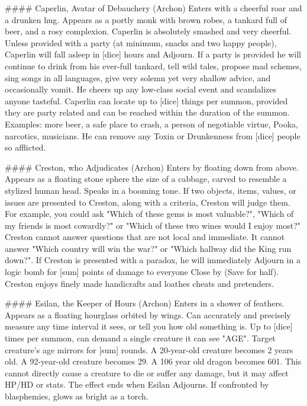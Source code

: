 ####  Caperlin, Avatar of Debauchery (Archon)
Enters with a cheerful roar and a drunken hug. Appears as a portly monk with brown robes, a tankard full of beer, and a rosy complexion. Caperlin is absolutely smashed and very cheerful. Unless provided with a party (at minimum, snacks and two happy people), Caperlin will fall asleep in [dice] hours and Adjourn. If a party is provided he will continue to drink from his ever-full tankard, tell wild tales, propose mad schemes, sing songs in all languages, give very solemn yet very shallow advice, and occasionally vomit. He cheers up any low-class social event and scandalizes anyone tasteful. Caperlin can locate up to [dice] things per summon, provided they are party related and can be reached within the duration of the summon. Examples: more beer, a safe place to crash, a person of negotiable virtue, Pooka, narcotics, musicians.  He can remove any Toxin or Drunkenness from [dice] people so afflicted.




####  Creston, who Adjudicates (Archon)
Enters by floating down from above. Appears as a floating stone sphere the size of a cabbage, carved to resemble a stylized human head. Speaks in a booming tone. If two objects, items, values, or issues are presented to Creston, along with a criteria, Creston will judge them. For example, you could ask "Which of these gems is most valuable?", "Which of my friends is most cowardly?" or "Which of these two wines would I enjoy most?" Creston cannot answer questions that are not local and immediate. It cannot answer "Which country will win the war?" or "Which hallway did the King run down?".  If Creston is presented with a paradox, he will immediately Adjourn in a logic bomb for [sum] points of damage to everyone Close by (Save for half).  Creston enjoys finely made handicrafts and loathes cheats and pretenders. 


####  Esilan, the Keeper of Hours (Archon)
Enters in a shower of feathers. Appears as a floating hourglass orbited by wings. Can accurately and precisely measure any time interval it sees, or tell you how old something is.  Up to [dice] times per summon, can demand a single creature it can see "AGE". Target creature's age mirrors for [sum] rounds. A 20-year-old creature becomes 2 years old. A 92-year-old creature becomes 29. A 106 year old dragon becomes 601. This cannot directly cause a creature to die or suffer any damage, but it may affect HP/HD or stats.  The effect ends when Esilan Adjourns. If confronted by blasphemies, glows as bright as a torch.



